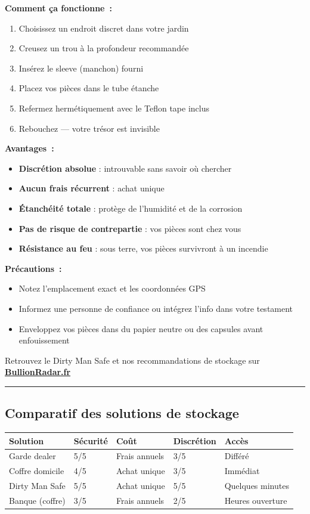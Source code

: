 \documentclass[14pt,a4paper]{extarticle}
\newcommand{\goldsep}{%
  \begin{center}
    \textcolor{gold}{\rule{6cm}{0.4pt}}
  \end{center}
}
\begin{document}
\textbf{Comment ça fonctionne~:}
\begin{enumerate}
  \item Choisissez un endroit discret dans votre jardin
  \item Creusez un trou à la profondeur recommandée
  \item Insérez le sleeve (manchon) fourni
  \item Placez vos pièces dans le tube étanche
  \item Refermez hermétiquement avec le Teflon tape inclus
  \item Rebouchez --- votre trésor est invisible
\end{enumerate}

\textbf{Avantages~:}
\begin{itemize}
  \item \textbf{Discrétion absolue} : introuvable sans savoir où chercher
  \item \textbf{Aucun frais récurrent} : achat unique
  \item \textbf{Étanchéité totale} : protège de l'humidité et de la corrosion
  \item \textbf{Pas de risque de contrepartie} : vos pièces sont chez vous
  \item \textbf{Résistance au feu} : sous terre, vos pièces survivront à un incendie
\end{itemize}

\textbf{Précautions~:}
\begin{itemize}
  \item Notez l'emplacement exact et les coordonnées GPS
  \item Informez une personne de confiance ou intégrez l'info dans votre testament
  \item Enveloppez vos pièces dans du papier neutre ou des capsules avant enfouissement
\end{itemize}

Retrouvez le Dirty Man Safe et nos recommandations de stockage sur \href{https://bullionradar.fr/solutions-stockage}{\textbf{BullionRadar.fr}}

\goldsep

\subsection*{Comparatif des solutions de stockage}

\begin{center}
\begin{tabular}{|l|l|l|l|l|}
\hline
\rowcolor{gold!20} \textbf{Solution} & \textbf{Sécurité} & \textbf{Coût} & \textbf{Discrétion} & \textbf{Accès} \\
\hline
Garde dealer & 5/5 & Frais annuels & 3/5 & Différé \\
\hline
Coffre domicile & 4/5 & Achat unique & 3/5 & Immédiat \\
\hline
Dirty Man Safe & 5/5 & Achat unique & 5/5 & Quelques minutes \\
\hline
Banque (coffre) & 3/5 & Frais annuels & 2/5 & Heures ouverture \\
\hline
\end{tabular}
\end{center}
\end{document}
